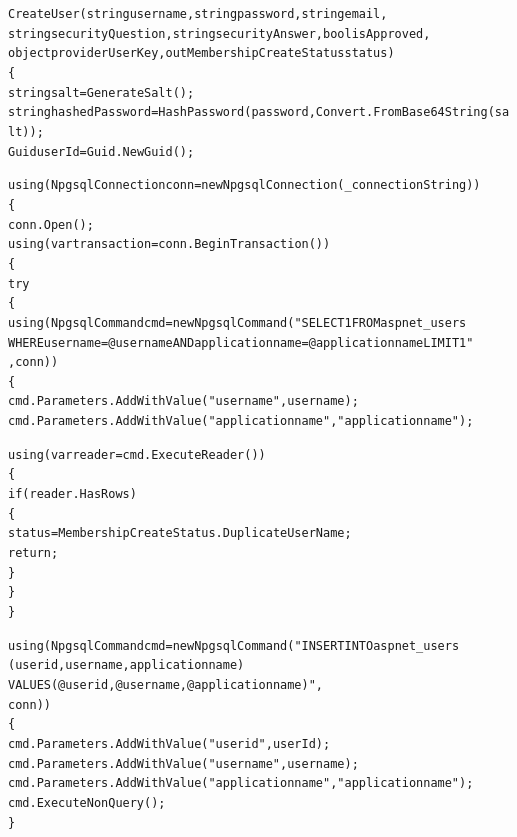 \documentclass[14pt]{article}
\begin{document}
\begin{mdframed}[backgroundcolor=white, linecolor=black, roundcorner=5pt]
\begin{alltt}
CreateUser(string username, string password, string email, 
string securityQuestion, string securityAnswer, bool isApproved, 
object providerUserKey, out MembershipCreateStatus status)
\{
    string salt = GenerateSalt();
    string hashedPassword = HashPassword(password, Convert.FromBase64String(salt));
    Guid userId = Guid.NewGuid();

    using (NpgsqlConnection conn = new NpgsqlConnection(_connectionString))
    \{
        conn.Open();
        using (var transaction = conn.BeginTransaction())
        \{
            try
            \{                       
                using (NpgsqlCommand cmd = new NpgsqlCommand("SELECT 1 FROM aspnet_users 
                WHERE username = @username AND applicationname = @applicationname LIMIT 1"
                , conn))
                \{
                    cmd.Parameters.AddWithValue("username", username);
                    cmd.Parameters.AddWithValue("applicationname", "applicationname");

                    using (var reader = cmd.ExecuteReader())
                    \{
                        if (reader.HasRows)
                        \{
                            status = MembershipCreateStatus.DuplicateUserName;
                            return;
                        \}
                    \}
                \}

                using (NpgsqlCommand cmd = new NpgsqlCommand("INSERT INTO aspnet_users 
                (userid, username, applicationname) 
                VALUES (@userid, @username, @applicationname)", 
                conn))
                \{
                    cmd.Parameters.AddWithValue("userid", userId);
                    cmd.Parameters.AddWithValue("username", username);
                    cmd.Parameters.AddWithValue("applicationname", "applicationname");
                    cmd.ExecuteNonQuery();
                \}


\end{alltt}
\end{mdframed}
\end{document}

